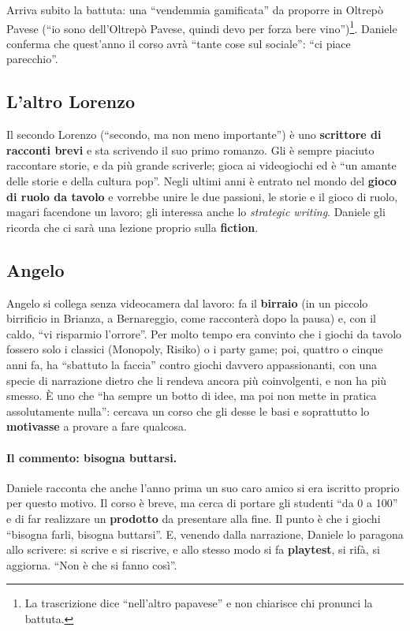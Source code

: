 Arriva subito la battuta: una ``vendemmia gamificata'' da proporre in Oltrepò
Pavese (``io sono dell'Oltrepò Pavese, quindi devo per forza bere vino'')\footnote{La
trascrizione dice ``nell'altro papavese'' e non chiarisce chi pronunci la
battuta.}. Daniele conferma che quest'anno il corso avrà ``tante cose sul
sociale'': ``ci piace parecchio''.

\subsection{L'altro Lorenzo}

Il secondo Lorenzo (``secondo, ma non meno importante'') è uno \textbf{scrittore
di racconti brevi} e sta scrivendo il suo primo romanzo. Gli è sempre piaciuto
raccontare storie, e da più grande scriverle; gioca ai videogiochi ed è ``un
amante delle storie e della cultura pop''. Negli ultimi anni è entrato nel mondo
del \textbf{gioco di ruolo da tavolo} e vorrebbe unire le due passioni, le
storie e il gioco di ruolo, magari facendone un lavoro; gli interessa anche lo
\emph{strategic writing}. Daniele gli ricorda che ci sarà una lezione proprio
sulla \textbf{fiction}.

\subsection{Angelo}

Angelo si collega senza videocamera dal lavoro: fa il \textbf{birraio} (in un
piccolo birrificio in Brianza, a Bernareggio, come racconterà dopo la pausa) e,
con il caldo, ``vi risparmio l'orrore''. Per molto tempo era convinto che i
giochi da tavolo fossero solo i classici (Monopoly, Risiko) o i party game; poi,
quattro o cinque anni fa, ha ``sbattuto la faccia'' contro giochi davvero
appassionanti, con una specie di narrazione dietro che li rendeva ancora più
coinvolgenti, e non ha più smesso. È uno che ``ha sempre un botto di idee, ma poi
non mette in pratica assolutamente nulla'': cercava un corso che gli desse le
basi e soprattutto lo \textbf{motivasse} a provare a fare qualcosa.

\paragraph{Il commento: bisogna buttarsi.} Daniele racconta che anche l'anno
prima un suo caro amico si era iscritto proprio per questo motivo. Il corso è
breve, ma cerca di portare gli studenti ``da 0 a 100'' e di far realizzare un
\textbf{prodotto} da presentare alla fine. Il punto è che i giochi ``bisogna
farli, bisogna buttarsi''. E, venendo dalla narrazione, Daniele lo paragona allo
scrivere: si scrive e si riscrive, e allo stesso modo si fa \textbf{playtest}, si
rifà, si aggiorna. ``Non è che si fanno così''.

